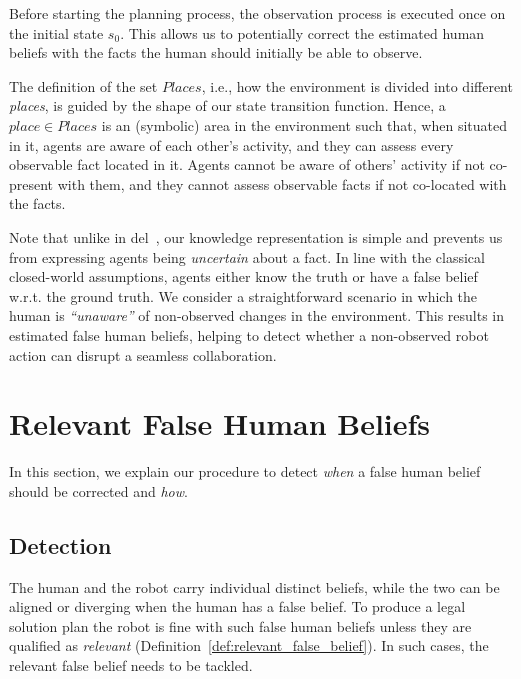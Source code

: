 Before starting the planning process, the observation process is executed once on the initial state $s_0$. This allows us to potentially correct the estimated human beliefs with the facts the human should initially be able to observe. 

The definition of the set $Places$, i.e., how the environment is divided into different \textit{places}, is guided by the shape of our state transition function. Hence, a $place \in Places$ is an (symbolic) area in the environment such that, when situated in it, agents are aware of each other's activity, and they can assess every observable fact located in it. Agents cannot be aware of others' activity if not co-present with them, and they cannot assess observable facts if not co-located with the facts.

Note that unlike in \acrshort{del}~\cite{KR2021-12}, our knowledge representation is simple and prevents us from expressing agents being \textit{uncertain} about a fact. 
In line with the classical closed-world assumptions, agents either know the truth or have a false belief w.r.t. the ground truth. 
We consider a straightforward scenario in which the human is \textit{``unaware''} of non-observed changes in the environment. 
This results in estimated false human beliefs, helping to detect whether a non-observed robot action can disrupt a seamless collaboration. 

\section{Relevant False Human Beliefs}

In this section, we explain our procedure to detect \textit{when} a false human belief should be corrected and \textit{how}.


    \subsection{Detection}

The human and the robot carry individual distinct beliefs, while the two can be aligned or diverging when the human has a false belief. To produce a legal solution plan the robot is fine with such false human beliefs unless they are qualified as \textit{relevant} (Definition~\ref{def:relevant_false_belief}). In such cases, the relevant false belief needs to be tackled.

